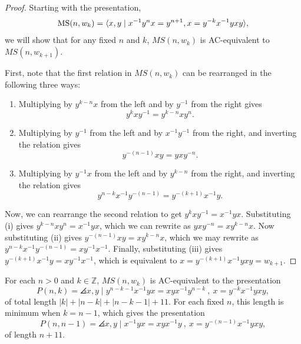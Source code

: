 \begin{proof}
    Starting with the presentation,
        \[
\text{MS}(n, w_k) = \langle x, y \mid x^{-1} y^n x = y^{n+1}, x = y^{-k} x^{-1} y x y\rangle,
\]
    we will show that for any fixed $n$ and $k$, $MS(n, w_k)$ is AC-equivalent to $MS(n, w_{k+1})$.

    First, note that the first relation in $MS(n, w_k)$ can be rearranged in the following three ways:
    \begin{enumerate}[label=(\roman*)]
        \item Multiplying by $y^{k-n}x$ from the left and by $y^{-1}$ from the right gives 
        \[
            y^kxy^{-1}=y^{k-n}xy^n.
        \]
        \item Multiplying by $y^{-1}$ from the left and by $x^{-1}y^{-1}$ from the right, and inverting the relation gives 
        \[
            y^{-(n-1)}xy = yxy^{-n}.
        \]
        \item Multiplying by $y^{-1}x$ from the left and by $y^{k-n}$ from the right, and inverting the relation gives
        \[
            y^{n-k}x^{-1}y^{-(n-1)}=y^{-(k+1)}x^{-1}y.
        \]
    \end{enumerate}

    Now, we can rearrange the second relation  to get $y^k x y^{-1}=x^{-1}yx$. Substituting (i) gives $y^{k-n} x y^n = x^{-1}yx$, which  we can rewrite as $yxy^{-n}=xy^{k-n}x$. Now substituting (ii) gives $ y^{-(n-1)}xy= xy^{k-n}x$, which we may rewrite as $y^{n-k}x^{-1}y^{-(n-1)}=xy^{-1}x^{-1}$. Finally, substituting (iii) gives $y^{-(k+1)}x^{-1}y=xy^{-1}x^{-1}$, which is equivalent to $x=y^{-(k+1)}x^{-1}yxy=w_{k+1}$. 
\end{proof}

\begin{theorem}\label{t:ms-short}
    For each $n > 0$ and $k \in \mathbb{Z}$, $MS(n, w_k)$ is AC-equivalent to the presentation
    \[P(n, k) = \angles{x, y \mid  y^{n-k-1}  x^{-1} y x = x y x^{-1} y^{n-k} \ , \ x = y^{-k} x^{-1} y x y },
    \]
    of total length $|k| + |n - k| + |n - k - 1| + 11$. For each fixed $n$, this length is minimum when $k=n-1$, which gives the presentation
    \[P(n, n-1) = \angles{x, y \mid   x^{-1} y x = x y x^{-1} y \ , \ x = y^{-(n-1)} x^{-1} y x y },
    \]
    of length $n+11$.
\end{theorem}

